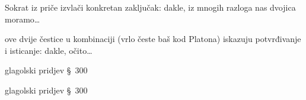 \begin{description}[noitemsep]
\item[πολλῶν δὴ οὖν ἕνεκα] Sokrat iz priče izvlači konkretan zaključak: dakle, iz mnogih razloga nas dvojica moramo\dots
\item[δὴ οὖν] ove dvije čestice u kombinaciji (vrlo česte baš kod Platona) iskazuju potvrđivanje i isticanje: dakle, očito\dots
\item[λεκτέον] glagolski pridjev §~300
\item[καθευδητέον] glagolski pridjev §~300
\end{description}

